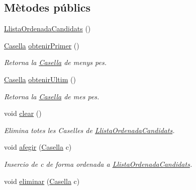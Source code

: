 \subsection*{Mètodes públics}
\begin{DoxyCompactItemize}
\item 
\hyperlink{classlogica_1_1algoritmica_1_1_llista_ordenada_candidats_afad457a1d2c326f2b32e93bfae58fe58}{Llista\+Ordenada\+Candidats} ()
\item 
\hyperlink{classlogica_1_1algoritmica_1_1_casella}{Casella} \hyperlink{classlogica_1_1algoritmica_1_1_llista_ordenada_candidats_a8d69cb86084a5fcf7fda75e85bf6221d}{obtenir\+Primer} ()
\begin{DoxyCompactList}\small\item\em Retorna la \hyperlink{classlogica_1_1algoritmica_1_1_casella}{Casella} de menys pes. \end{DoxyCompactList}\item 
\hyperlink{classlogica_1_1algoritmica_1_1_casella}{Casella} \hyperlink{classlogica_1_1algoritmica_1_1_llista_ordenada_candidats_ad6cdf565555d27f8e5b50ae67bc66e16}{obtenir\+Ultim} ()
\begin{DoxyCompactList}\small\item\em Retorna la \hyperlink{classlogica_1_1algoritmica_1_1_casella}{Casella} de mes pes. \end{DoxyCompactList}\item 
void \hyperlink{classlogica_1_1algoritmica_1_1_llista_ordenada_candidats_a0d405bdd9cb347353e4e29c35e064d5d}{clear} ()
\begin{DoxyCompactList}\small\item\em Elimina totes les Caselles de \hyperlink{classlogica_1_1algoritmica_1_1_llista_ordenada_candidats}{Llista\+Ordenada\+Candidats}. \end{DoxyCompactList}\item 
void \hyperlink{classlogica_1_1algoritmica_1_1_llista_ordenada_candidats_a047df4631890e7efea712ab7d711b715}{afegir} (\hyperlink{classlogica_1_1algoritmica_1_1_casella}{Casella} c)
\begin{DoxyCompactList}\small\item\em Insercio de c de forma ordenada a \hyperlink{classlogica_1_1algoritmica_1_1_llista_ordenada_candidats}{Llista\+Ordenada\+Candidats}. \end{DoxyCompactList}\item 
void \hyperlink{classlogica_1_1algoritmica_1_1_llista_ordenada_candidats_a66435e469e8d188173b8539aac7efd5b}{eliminar} (\hyperlink{classlogica_1_1algoritmica_1_1_casella}{Casella} c)

\end{DoxyCompactItemize}
